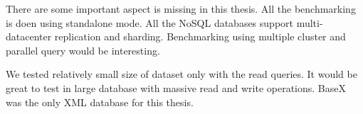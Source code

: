 There are some important aspect is missing in this thesis. All the benchmarking is doen using standalone mode. All the NoSQL databases support multi-datacenter replication and sharding. Benchmarking using multiple cluster and parallel query would be interesting. 


We tested relatively small size of dataset only with the read queries. It would be great to test in large database with massive read and write operations. BaseX was the only XML database for this thesis. 